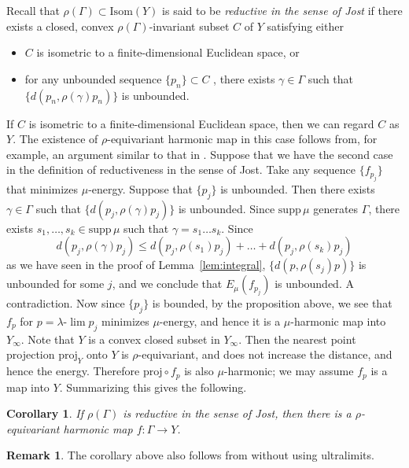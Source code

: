 \documentclass[12pt]{amsart}
\numberwithin{equation}{section}
\theoremstyle{plain}
\newtheorem{Corollary}[Theorem]{Corollary}
\theoremstyle{definition}
\newtheorem{Remark}[Theorem]{Remark}
\theoremstyle{remark}
\newcommand{\nrprj}{\mathrm{proj}}
\newcommand{\ene}[1]{E_{#1}}
\newcommand{\isom}[1]{\mathrm{Isom}({#1})}
\newcommand{\ulim}{\lambda{\text{-}}\!\lim}
\newcommand{\supp}{\mathrm{supp}\,}
\begin{document}
%
%
Recall that $\rho(\Gamma) \subset \isom{Y}$ is said to be 
{\it reductive in the sense of Jost}
if there exists a closed, convex $\rho(\Gamma)$-invariant subset $C$ of
$Y$ satisfying either
\begin{itemize}
 \item $C$ is isometric to a finite-dimensional Euclidean space, or
 \item for any unbounded sequence $\{p_n\} \subset C$ , there exists
       $\gamma \in \Gamma$ such that $\{d(p_n, \rho(\gamma)p_n)\}$ is
       unbounded. 
\end{itemize}
If $C$ is isometric to a finite-dimensional Euclidean space, then we can
regard $C$ as $Y$. 
The existence of $\rho$-equivariant harmonic map in this case follows
from, for example, an argument similar to that in \cite{labourie}. 
Suppose that we have the second case in the definition of reductiveness
in the sense of Jost. 
Take any sequence $\{f_{p_j}\}$ that minimizes $\mu$-energy. 
Suppose that $\{p_j\}$ is unbounded. 
Then there exists $\gamma \in \Gamma$ such that 
$\{d(p_j,\rho(\gamma)p_j)\}$ is unbounded. 
Since $\supp \mu$ generates $\Gamma$, there exists 
$s_1, \dots, s_k \in \supp \mu$ such that $\gamma=s_1\dots s_k$. 
Since
\begin{equation*}
 d(p_j, \rho(\gamma)p_j) \leq
 d(p_j, \rho(s_1)p_j) + \dots + d(p_j,\rho(s_k)p_j)
\end{equation*}
as we have seen in the proof of Lemma~\ref{lem:integral}, 
$\{d(p,\rho(s_j)p)\}$ is unbounded for some $j$, and we conclude that
$\ene{\mu}(f_{p_j})$ is unbounded.  
A contradiction. 
Now since $\{p_j\}$ is bounded, by the proposition above,  we see that
$f_p$ for $p=\ulim p_j$ minimizes $\mu$-energy, and hence it is
a $\mu$-harmonic map into $Y_{\infty}$.
Note that $Y$ is a convex closed subset in $Y_{\infty}$. 
Then the nearest point projection $\nrprj_Y$ onto $Y$ is
$\rho$-equivariant, and does not increase
the distance, and hence the energy.  
Therefore $\nrprj\circ f_{p}$ is also
$\mu$-harmonic; we may assume $f_{p}$ is a map into $Y$. 
Summarizing this gives the following. 

\begin{Corollary}
\label{cor:existence}
 If $\rho(\Gamma)$ is 
 reductive in the sense of Jost, then there is a $\rho$-equivariant
 harmonic map $f \colon \Gamma \rightarrow Y$. 
\end{Corollary}

\begin{Remark}
 \label{rem:korevaar-schoen}
 The corollary above also follows from 
 \cite[Proposition 1.2]{korevaar-schoen2} without using ultralimits. 
\end{Remark}
\end{document}
